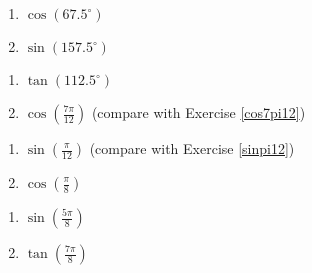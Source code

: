 \documentclass{ximera}
\begin{document}
\begin{multicols}{2}

\begin{enumerate}

\setcounter{enumi}{\value{HW}}

\item  $\cos(67.5^{\circ})$
\item  $\sin(157.5^{\circ})$

\setcounter{HW}{\value{enumi}}

\end{enumerate}

\end{multicols}

\begin{multicols}{2}

\begin{enumerate}

\setcounter{enumi}{\value{HW}}

\item  $\tan(112.5^{\circ})$ 
\item  $\cos\left( \frac{7\pi}{12} \right)$  (compare with Exercise \ref{cos7pi12})

\setcounter{HW}{\value{enumi}}

\end{enumerate}

\end{multicols}

\begin{multicols}{2}

\begin{enumerate}

\setcounter{enumi}{\value{HW}}

\item  $\sin\left( \frac{\pi}{12} \right)$  (compare with Exercise \ref{sinpi12})
\item $\cos \left( \frac{\pi}{8} \right)$

\setcounter{HW}{\value{enumi}}

\end{enumerate}

\end{multicols}

\begin{multicols}{2}

\begin{enumerate}

\setcounter{enumi}{\value{HW}}

\item $\sin \left( \frac{5\pi}{8} \right)$
\item $\tan \left( \frac{7\pi}{8} \right)$ \label{idenhalfanglelast}

\setcounter{HW}{\value{enumi}}

\end{enumerate}

\end{multicols}
\end{document}
